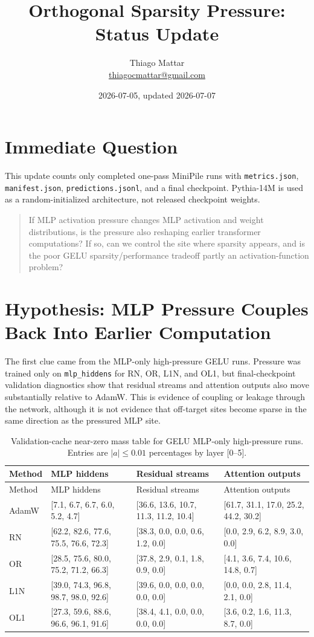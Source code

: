 \documentclass[10pt]{article}
\title{Orthogonal Sparsity Pressure: Status Update}
\author{Thiago Mattar\\\href{mailto:thiagocmattar@gmail.com}{thiagocmattar@gmail.com}}
\date{2026-07-05, updated 2026-07-07}
\newcommand{\code}[1]{\texttt{#1}}
\newcommand{\tightsection}[1]{\section{#1}\vspace{-0.35em}}
\newcommand{\nzvec}[6]{[#1, #2, #3, #4, #5, #6]}
\begin{document}
\maketitle
\vspace{-1.4em}

\tightsection{Immediate Question}

This update counts only completed one-pass MiniPile runs with \code{metrics.json}, \code{manifest.json}, \code{predictions.jsonl}, and a final checkpoint. Pythia-14M is used as a random-initialized architecture, not released checkpoint weights.

\begin{quote}
If MLP activation pressure changes MLP activation and weight distributions, is the pressure also reshaping earlier transformer computations? If so, can we control the site where sparsity appears, and is the poor GELU sparsity/performance tradeoff partly an activation-function problem?
\end{quote}

\tightsection{Hypothesis: MLP Pressure Couples Back Into Earlier Computation}

The first clue came from the MLP-only high-pressure GELU runs. Pressure was trained only on \code{mlp\_hiddens} for RN, OR, L1N, and OL1, but final-checkpoint validation diagnostics show that residual streams and attention outputs also move substantially relative to AdamW. This is evidence of coupling or leakage through the network, although it is not evidence that off-target sites become sparse in the same direction as the pressured MLP site.

\begin{longtable}{p{}p{}p{}p{}}
\caption{Validation-cache near-zero mass table for GELU MLP-only high-pressure runs. Entries are \(|a|\le0.01\) percentages by layer [0--5].}\\
\toprule
Method & MLP hiddens & Residual streams & Attention outputs \\
\midrule
\endfirsthead
\toprule
Method & MLP hiddens & Residual streams & Attention outputs \\
\midrule
\endhead
AdamW & \nzvec{7.1}{6.7}{6.7}{6.0}{5.2}{4.7} & \nzvec{36.6}{13.6}{10.7}{11.3}{11.2}{10.4} & \nzvec{61.7}{31.1}{17.0}{25.2}{44.2}{30.2} \\
RN & \nzvec{62.2}{82.6}{77.6}{75.5}{76.6}{72.3} & \nzvec{38.3}{0.0}{0.0}{0.6}{1.2}{0.0} & \nzvec{0.0}{2.9}{6.2}{8.9}{3.0}{0.0} \\
OR & \nzvec{28.5}{75.6}{80.0}{75.2}{71.2}{66.3} & \nzvec{37.8}{2.9}{0.1}{1.8}{0.9}{0.0} & \nzvec{4.1}{3.6}{7.4}{10.6}{14.8}{0.7} \\
L1N & \nzvec{39.0}{74.3}{96.8}{98.7}{98.0}{92.6} & \nzvec{39.6}{0.0}{0.0}{0.0}{0.0}{0.0} & \nzvec{0.0}{0.0}{2.8}{11.4}{2.1}{0.0} \\
OL1 & \nzvec{27.3}{59.6}{88.6}{96.6}{96.1}{91.6} & \nzvec{38.4}{4.1}{0.0}{0.0}{0.0}{0.0} & \nzvec{3.6}{0.2}{1.6}{11.3}{8.7}{0.0} \\
\bottomrule
\end{longtable}
\end{document}
